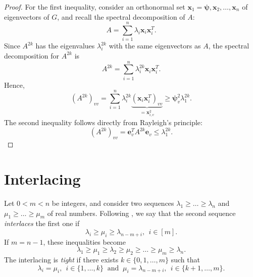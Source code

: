 \begin{proof}
    For the first inequality, consider an orthonormal set $\bm{x}_1 = \bm{\psi}, \bm{x}_2, \dots, \bm{x}_n$ of eigenvectors of $G$, and recall the spectral decomposition of $A$: 
    \begin{equation*}
        A = \sum \limits_{i = 1}^n \lambda_i \bm{x}_i \bm{x}_i^T.
    \end{equation*}
    Since $A^{2k}$ has the eigenvalues $\lambda_i^{2k}$ with the same eigenvectors as $A$, the spectral decomposition for $A^{2k}$ is  
    \begin{equation*}
        A^{2k} = \sum \limits_{i = 1}^n \lambda_i^{2k} \bm{x}_i \bm{x}_i^T.
    \end{equation*}
    Hence,
    \begin{equation*}
        (A^{2k})_{vv} = \sum \limits_{i = 1}^n \lambda_i^{2k} \underbrace{(\bm{x}_i \bm{x}_i^T)_{vv}}_{= \bm{x}_{i, v}^2} \ge \bm{\psi}_v^2 \lambda_1^{2k}.
    \end{equation*}
    The second inequality follows directly from Rayleigh's principle: 
    \begin{equation*}
        (A^{2k})_{vv} = \bm{e}^T_v A^{2k} \bm{e}_v \le \lambda_1^{2k}.
    \end{equation*}
\end{proof}

\section{Interlacing}

Let $0 < m < n$ be integers, and consider two sequences $\lambda_1 \ge \dots \ge \lambda_n$ and $\mu_1 \ge \dots \ge \mu_m$ of real numbers. 
Following \cite{brouwerhaemers}, we say that the second sequence \textit{interlaces} the first one if 
\begin{equation*}
    \lambda_i \ge \mu_i \ge \lambda_{n - m + i}, \ \ i \in [m].
\end{equation*}
If $m = n - 1$, these inequalities become
\begin{equation*}
    \lambda_1 \ge \mu_1 \ge \lambda_2 \ge \mu_2 \ge \dots \ge \mu_{m} \ge \lambda_{n}.
\end{equation*}
The interlacing is \textit{tight} if there exists $k \in \{0, 1, \dots, m \}$ such that 
\begin{equation*}
    \lambda_i = \mu_i, \ \ i \in \{ 1, \dots, k\} \ \text{ and } \ \mu_i = \lambda_{n -m + i}, \ \ i \in \{ k + 1, \dots, m\}.
\end{equation*}

